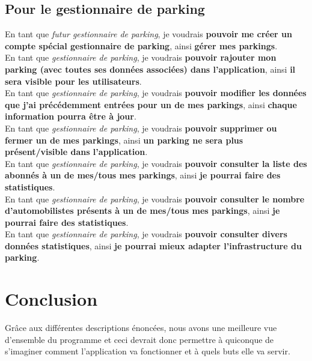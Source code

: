 \documentclass[a4paper,11pt]{article}
\newcommand{\userstory}[3]{En tant #1, je voudrais \textbf{#2}, ainsi \textbf{#3}.\\}
\newcommand{\etgp}[2]{\userstory{que \textit{gestionnaire de parking}}{#1}{#2}}
\begin{document}
\subsection{Pour le gestionnaire de parking}
  \noindent
  \userstory{que \textit{futur gestionnaire de parking}}{pouvoir me créer un compte spécial gestionnaire de parking}{gérer mes parkings}
  \etgp{pouvoir rajouter mon parking (avec toutes ses données associées) dans l'application}{il sera visible pour les utilisateurs}
  \etgp{pouvoir modifier les données que j'ai précédemment entrées pour un de mes parkings}{chaque information pourra être à jour}
  \etgp{pouvoir supprimer ou fermer un de mes parkings}{un parking ne sera plus présent/visible dans l'application} 
  \etgp{pouvoir consulter la liste des abonnés à un de mes/tous mes parkings}{je pourrai faire des statistiques}
  \etgp{pouvoir consulter le nombre d'automobilistes présents à un de mes/tous mes parkings}{je pourrai faire des statistiques}
  \etgp{pouvoir consulter divers données statistiques}{je pourrai mieux adapter l'infrastructure du parking}

\section*{Conclusion}
Grâce aux différentes descriptions énoncées, nous avons une meilleure vue d'ensemble du programme et ceci devrait donc permettre à quiconque de s'imaginer comment l'application va fonctionner et à quels buts elle va servir.
\end{document}
